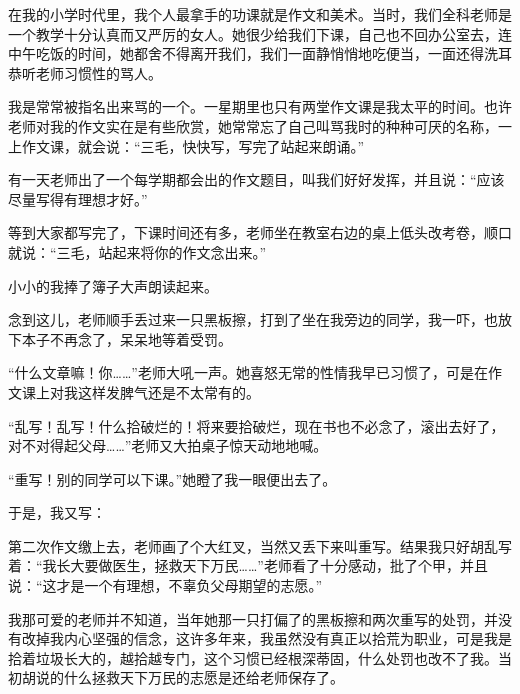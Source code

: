 \par 在我的小学时代里，我个人最拿手的功课就是作文和美术。当时，我们全科老师是一个教学十分认真而又严厉的女人。她很少给我们下课，自己也不回办公室去，连中午吃饭的时间，她都舍不得离开我们，我们一面静悄悄地吃便当，一面还得洗耳恭听老师习惯性的骂人。
\par 我是常常被指名出来骂的一个。一星期里也只有两堂作文课是我太平的时间。也许老师对我的作文实在是有些欣赏，她常常忘了自己叫骂我时的种种可厌的名称，一上作文课，就会说：“三毛，快快写，写完了站起来朗诵。”
\par 有一天老师出了一个每学期都会出的作文题目，叫我们好好发挥，并且说：“应该尽量写得有理想才好。”
\par 等到大家都写完了，下课时间还有多，老师坐在教室右边的桌上低头改考卷，顺口就说：“三毛，站起来将你的作文念出来。”
\par 小小的我捧了簿子大声朗读起来。
\par 念到这儿，老师顺手丢过来一只黑板擦，打到了坐在我旁边的同学，我一吓，也放下本子不再念了，呆呆地等着受罚。
\par “什么文章嘛！你……”老师大吼一声。她喜怒无常的性情我早已习惯了，可是在作文课上对我这样发脾气还是不太常有的。
\par “乱写！乱写！什么拾破烂的！将来要拾破烂，现在书也不必念了，滚出去好了，对不对得起父母……”老师又大拍桌子惊天动地地喊。
\par “重写！别的同学可以下课。”她瞪了我一眼便出去了。
\par 于是，我又写：
\par 第二次作文缴上去，老师画了个大红叉，当然又丢下来叫重写。结果我只好胡乱写着：“我长大要做医生，拯救天下万民……”老师看了十分感动，批了个甲，并且说：“这才是一个有理想，不辜负父母期望的志愿。”
\par 我那可爱的老师并不知道，当年她那一只打偏了的黑板擦和两次重写的处罚，并没有改掉我内心坚强的信念，这许多年来，我虽然没有真正以拾荒为职业，可是我是拾着垃圾长大的，越拾越专门，这个习惯已经根深蒂固，什么处罚也改不了我。当初胡说的什么拯救天下万民的志愿是还给老师保存了。

